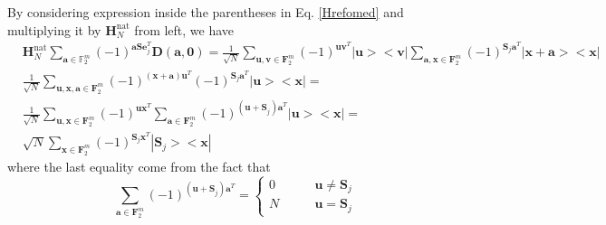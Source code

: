 \documentclass{article}
\begin{document}
\begin{enumerate}
		By considering expression inside the parentheses in  Eq. \eqref{Hrefomed} and multiplying it by $\mathbf{H}_N^{\text{nat}}$ from left, we have
		\begin{align}
			&\mathbf{H}_N^{\text{nat}} \sum_{\mathbf{a} \in \mathbb{F}^m_2}{(-1)^{\mathbf{a S }\mathbf{e}_j^T} \mathbf{D(a,0)}}= \frac{1}{\sqrt{N}} \sum_{\mathbf{u}, \mathbf{v} \in \mathbf{F}_2^m}{\left(-1\right)^{\mathbf{u} \mathbf{v}^T } |\mathbf{u}><\mathbf{v}|} \sum_{\mathbf{a}, \mathbf{x} \in \mathbf{F}_2^m}{\left(-1\right)^{\mathbf{S}_j \mathbf{a}^T } |\mathbf{x+a}><\mathbf{x}|} \nonumber \\
			& \frac{1}{\sqrt{N}} \sum_{\mathbf{u}, \mathbf{x}, \mathbf{a} \in \mathbf{F}_2^m}{(-1)^{(\mathbf{x+a})\mathbf{u}^T} (-1)^{\mathbf{S}_j \mathbf{a}^T}|\mathbf{u}><\mathbf{x}| }= \nonumber \\ 
			&\frac{1}{\sqrt{N}} \sum_{\mathbf{u}, \mathbf{x} \in \mathbf{F}_2^m}{(-1)^{\mathbf{u} \mathbf{x}^T} \sum_{ \mathbf{a} \in \mathbf{F}_2^m}{(-1)^{(\mathbf{u+S}_j)\mathbf{a}^T}} |\mathbf{u}><\mathbf{x}| } = \nonumber \\
			&\sqrt{N} \sum_{ \mathbf{x} \in \mathbf{F}_2^m}{(-1)^{\mathbf{S}_j \mathbf{x}^T} |\mathbf{S}_j><\mathbf{x}| }\label{HsubRes}
		\end{align}
		where the last equality come from the fact that 
		\begin{equation}
			\sum_{ \mathbf{a} \in \mathbf{F}_2^m}{(-1)^{(\mathbf{u+S}_j)\mathbf{a}^T}} = 
			\begin{cases}
				0 & \qquad \mathbf{u} \neq \mathbf{S}_j \\
				N & \qquad \mathbf{u} = \mathbf{S}_j
			\end{cases}
		\end{equation}
		

\end{enumerate}
\end{document}
